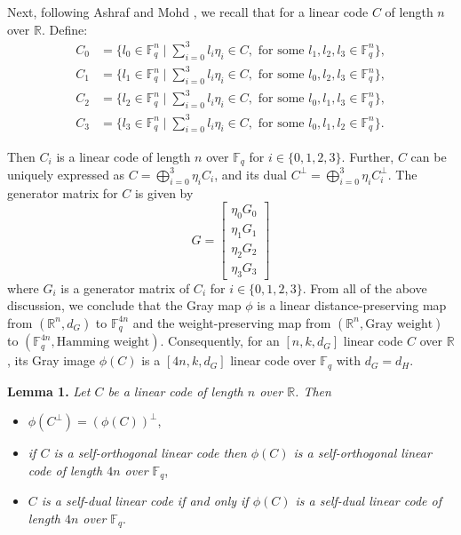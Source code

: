 \documentclass[12pt]{article}
\begin{document}
Next, following Ashraf and Mohd \cite{21}, we recall that for a linear code $C$ of length $n$ over $\mathbb{R}$. Define:
\begin{align*}
C_0 &= \{ l_0 \in \mathbb{F}_q^n \mid \sum_{i=0}^3 l_i \eta_i \in C, \text{ for some } l_1, l_2, l_3 \in \mathbb{F}_q^n \}, \\
C_1 &= \{ l_1 \in \mathbb{F}_q^n \mid \sum_{i=0}^3 l_i \eta_i \in C, \text{ for some } l_0, l_2, l_3 \in \mathbb{F}_q^n \}, \\
C_2 &= \{ l_2 \in \mathbb{F}_q^n \mid \sum_{i=0}^3 l_i \eta_i \in C, \text{ for some } l_0, l_1, l_3 \in \mathbb{F}_q^n \}, \\
C_3 &= \{ l_3 \in \mathbb{F}_q^n \mid \sum_{i=0}^3 l_i \eta_i \in C, \text{ for some } l_0, l_1, l_2 \in \mathbb{F}_q^n \}.
\end{align*}

Then $C_i$ is a linear code of length $n$ over $\mathbb{F}_q$ for $i \in \{0,1,2,3\}$. Further, $C$ can be uniquely expressed as $C = \bigoplus_{i=0}^3 \eta_i C_i$, and its dual $C^\perp = \bigoplus_{i=0}^3 \eta_i C_i^\perp$. The generator matrix for $C$ is given by
\begin{equation}
G = \begin{bmatrix}
\eta_0 G_0 \\
\eta_1 G_1 \\
\eta_2 G_2 \\
\eta_3 G_3
\end{bmatrix}
\end{equation}
where $G_i$ is a generator matrix of $C_i$ for $i \in \{0,1,2,3\}$. From all of the above discussion, we conclude that the Gray map $\phi$ is a linear distance-preserving map from $(\mathbb{R}^n, d_G)$ to $\mathbb{F}_q^{4n}$ and the weight-preserving map from $(\mathbb{R}^n, \text{Gray weight})$ to $(\mathbb{F}_q^{4n}, \text{Hamming weight})$. Consequently, for an $[n, k, d_G]$ linear code $C$ over $\mathbb{R}$, its Gray image $\phi(C)$ is a $[4n, k, d_G]$ linear code over $\mathbb{F}_q$ with $d_G = d_H$.

\textbf{Lemma 1.} \textit{Let $C$ be a linear code of length $n$ over $\mathbb{R}$. Then}
\begin{itemize}
    \item[(a)] $\phi(C^\perp) = (\phi(C))^\perp$,
    \item[(b)] \textit{if $C$ is a self-orthogonal linear code then $\phi(C)$ is a self-orthogonal linear code of length $4n$ over $\mathbb{F}_q$},
    \item[(c)] \textit{$C$ is a self-dual linear code if and only if $\phi(C)$ is a self-dual linear code of length $4n$ over $\mathbb{F}_q$}.
\end{itemize}
\end{document}
